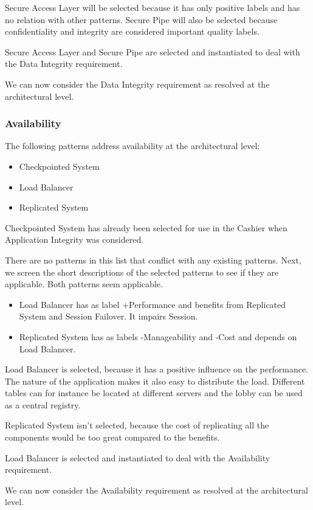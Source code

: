 \documentclass[a4paper,11pt]{report}
\begin{document}
Secure Access Layer will be selected because it has only positive labels and has no relation with other patterns.
Secure Pipe will also be selected because confidentiality and integrity are considered important quality labels.

Secure Access Layer and Secure Pipe are selected and instantiated to deal with the Data Integrity requirement.

We can now consider the Data Integrity requirement as resolved at the architectural level.
\subsubsection{Availability}
The following patterns address availability at the architectural level:
\begin{itemize}
\item Checkpointed System
\item Load Balancer
\item Replicated System
\end{itemize}

Checkpointed System has already been selected for use in the Cashier when Application Integrity was considered.

There are no patterns in this list that conflict with any existing patterns.
Next, we screen the short descriptions of the selected patterns to see if they are applicable. Both patterns seem
applicable.

\begin{itemize}
\item Load Balancer has as label +Performance and benefits from Replicated System and Session Failover. It impairs 
Session.
\item Replicated System has as labels -Manageability and -Cost and depends on Load Balancer.
\end{itemize}

Load Balancer is selected, because it has a positive influence on the performance. The nature of the application
makes it also easy to distribute the load. Different tables can for instance be located at different servers and the lobby
can be used as a central registry.

Replicated System isn't selected, because the cost of replicating all the components would be too great compared
to the benefits.

Load Balancer is selected and instantiated to deal with the Availability requirement.

We can now consider the Availability requirement as resolved at the architectural level.
\end{document}
